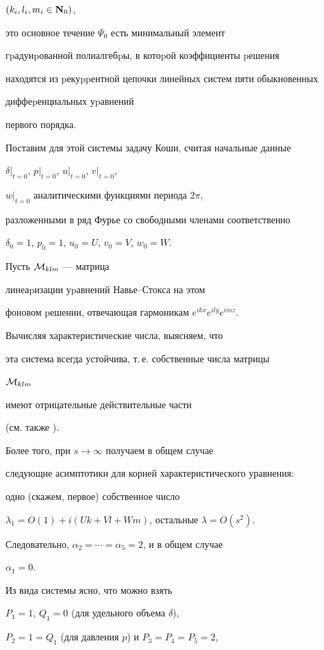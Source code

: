 $(k_i, l_i, m_i\in \bold N_0)$,


это основное течение $\Psi_0$ есть минимальный элемент


гpадуиpованной полиалгебpы, в котоpой коэффициенты pешения


находятся из pекуppентной цепочки линейных систем пяти обыкновенных


диффеpенциальных уpавнений


первого порядка.





Поставим для этой системы задачу Коши, считая начальные данные


$\delta|_{t=0}$, $p|_{t=0}$, $u|_{t=0}$, $v|_{t=0}$,


$w|_{t=0}$ аналитическими функциями периода $2\pi$,


разложенными в ряд Фурье со свободными членами соответственно


$\delta_0=1$, $p_0=1$, $u_0=U$, $v_0=V$, $w_0=W$.





Пусть ${\cal{M}}_{klm}$ --- матрица


линеаpизации уpавнений Навье--Стокса на этом


фоновом pешении, отвечающая гармоникам $e^{ikx}e^{ily}e^{imz}$.


Вычисляя характеристические числа, выясняем, что


эта система всегда устойчива, т.\,е. собственные числа матрицы


${\cal{M}}_{klm}$


имеют отрицательные действительные части


(см. также \cite{ShatovDAN}).


Более того, при $s\rightarrow\infty$ получаем в общем случае


следующие асимптотики для корней характеристического уравнения:


одно (скажем, первое) собственное число


$\lambda_1=O(1)+i(Uk+Vl+Wm)$, остальные $\lambda=O(s^2)$.


Следовательно, $\alpha_2=\dotsb=\alpha_5=2$, и в общем случае


$\alpha_1=0$.


Из вида системы ясно, что можно взять


$P_1=1$, $Q_1=0$ (для удельного объема $\delta$),


$P_2=1=Q_1$ (для давления $p$) и $P_3=P_4=P_5=2$,


